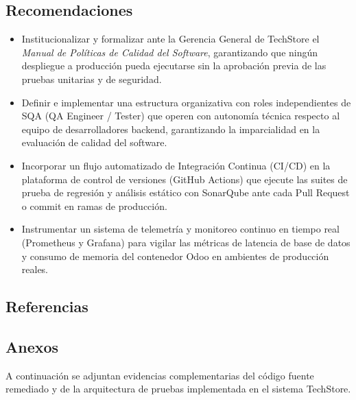 \documentclass{article}
\begin{document}
\subsection{Recomendaciones}
\begin{itemize}
    \item Institucionalizar y formalizar ante la Gerencia General de TechStore el \textit{Manual de Políticas de Calidad del Software}, garantizando que ningún despliegue a producción pueda ejecutarse sin la aprobación previa de las pruebas unitarias y de seguridad.
    \item Definir e implementar una estructura organizativa con roles independientes de SQA (QA Engineer / Tester) que operen con autonomía técnica respecto al equipo de desarrolladores backend, garantizando la imparcialidad en la evaluación de calidad del software.
    \item Incorporar un flujo automatizado de Integración Continua (CI/CD) en la plataforma de control de versiones (GitHub Actions) que ejecute las suites de prueba de regresión y análisis estático con SonarQube ante cada Pull Request o commit en ramas de producción.
    \item Instrumentar un sistema de telemetría y monitoreo continuo en tiempo real (Prometheus y Grafana) para vigilar las métricas de latencia de base de datos y consumo de memoria del contenedor Odoo en ambientes de producción reales.
\end{itemize}

\subsection{Referencias}

\vspace{-2.5em}
\renewcommand{\refname}{}

\nocite{*}


\subsection{Anexos}
A continuación se adjuntan evidencias complementarias del código fuente remediado y de la arquitectura de pruebas implementada en el sistema TechStore.
\end{document}
